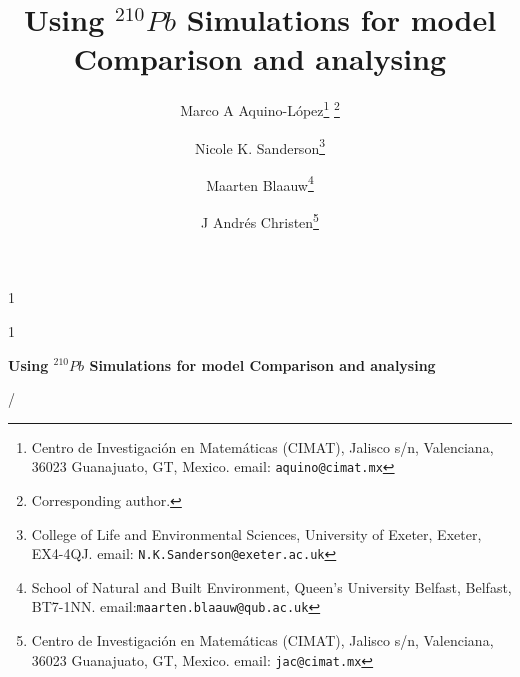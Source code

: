 \documentclass [10pt] {article}
\date{ }
\newcommand{\blind}{1}
\newcommand{\papertitle}{Using $^{210}Pb$ Simulations for model Comparison and analysing}
\begin{document}
	\def\spacingset#1{\renewcommand{\baselinestretch}%
		{#1}\small\normalsize} \spacingset{1}
	\blind
	{
		\title{\textbf{\papertitle}}

		\author{Marco A Aquino-L\'opez\thanks{
				Centro de Investigaci\'on en Matem\'aticas (CIMAT),
				Jalisco s/n, Valenciana, 36023 Guanajuato, GT, Mexico.
				email: \texttt{aquino@cimat.mx} } \thanks{Corresponding author.}
					\and
			Nicole K. Sanderson\thanks{
				College of Life and Environmental Sciences, University of Exeter,
				Exeter, EX4-4QJ.
				email: \texttt{N.K.Sanderson@exeter.ac.uk}}
					\and
			Maarten Blaauw\thanks{School of Natural and Built Environment,
				Queen's University Belfast,
				Belfast, BT7-1NN.
				email:\texttt{maarten.blaauw@qub.ac.uk}  }
					\and
			J Andr\'es Christen\thanks{
				Centro de Investigaci\'on en Matem\'aticas (CIMAT),
				Jalisco s/n, Valenciana, 36023 Guanajuato, GT, Mexico.
				email: \texttt{jac@cimat.mx}  }
			}
		\maketitle
	} \fi

	\blind
	{
		\bigskip
		\bigskip
		\bigskip
		\begin{center}
			{\LARGE\bf \papertitle}
		\end{center}
		\medskip/
	} \fi
\end{document}

